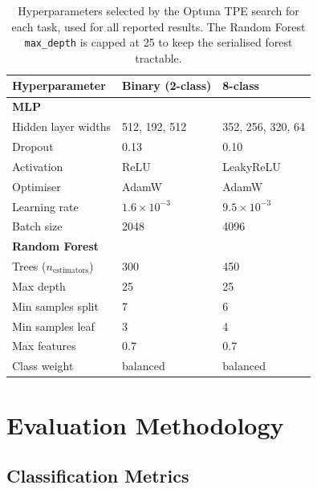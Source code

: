 \begin{table}[htbp]
\begin{center}
\begin{tabular}{|p{150pt}|p{90pt}|p{90pt}|}
\hline
\textbf{Hyperparameter} & \textbf{Binary (2-class)} & \textbf{8-class} \\
\hline
\multicolumn{3}{|l|}{\textbf{MLP}} \\
\hline
Hidden layer widths & 512, 192, 512 & 352, 256, 320, 64 \\
\hline Dropout & 0.13 & 0.10 \\
\hline Activation & ReLU & LeakyReLU \\
\hline Optimiser & AdamW & AdamW \\
\hline Learning rate & $1.6\times10^{-3}$ & $9.5\times10^{-3}$ \\
\hline Batch size & 2048 & 4096 \\
\hline
\multicolumn{3}{|l|}{\textbf{Random Forest}} \\
\hline
Trees ($n_\text{estimators}$) & 300 & 450 \\
\hline Max depth & 25 & 25 \\
\hline Min samples split & 7 & 6 \\
\hline Min samples leaf & 3 & 4 \\
\hline Max features & 0.7 & 0.7 \\
\hline Class weight & balanced & balanced \\
\hline
\end{tabular}
\end{center}
\caption{Hyperparameters selected by the Optuna TPE search for each task, used for all reported results. The Random Forest \texttt{max\_depth} is capped at 25 to keep the serialised forest tractable.}
\label{tab:hpo_selected}
\end{table}

\section{Evaluation Methodology}
\label{sec:evaluation_methodology}

\subsection{Classification Metrics}
\label{subsec:classification_metrics}


